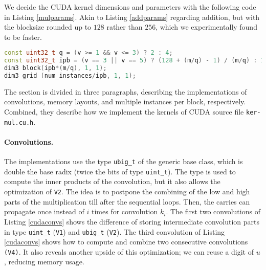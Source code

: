 We decide the CUDA kernel dimensions and parameters with the following code in
Listing \ref{mulparams}. Akin to Listing \ref{addparams} regarding addition, but
with the blocksize rounded up to $128$ rather than $256$, which we
experimentally found to be faster.

\begin{lstlisting}[language=CPP,caption={\footnotesize CUDA multiplication parameters and kernel dimensions.},label={mulparams}]
const uint32_t q = (v >= 1 && v <= 3) ? 2 : 4;
const uint32_t ipb = (v == 3 || v == 5) ? (128 + (m/q) - 1) / (m/q) : 1;
dim3 block(ipb*(m/q), 1, 1);
dim3 grid (num_instances/ipb, 1, 1);
\end{lstlisting}

The section is divided in three paragraphs, describing the implementations of
convolutions, memory layouts, and multiple instances per block,
respectively. Combined, they describe how we implement the kernels of CUDA
source file \texttt{ker-mul.cu.h}.

\paragraph{Convolutions.}
The implementations use the type \texttt{ubig\_t} of the generic base class,
which is double the base radix (twice the bits of type \texttt{uint\_t}). The
type is used to compute the inner products of the convolution, but it also
allows the optimization of \texttt{V2}. The idea is to postpone the combining of
the low and high parts of the multiplication till after the sequential
loops. Then, the carries can propagate once instead of $i$ times for convolution
$k_i$. The first two convolutions of Listing \ref{cudaconvs} shows the
difference of storing intermediate convolution parts in type \texttt{uint\_t}
(\texttt{V1}) and \texttt{ubig\_t} (\texttt{V2}). The third convolution of
Listing \ref{cudaconvs} shows how to compute and combine two consecutive
convolutions \texttt{(V4)}. It also reveals another upside of this optimization;
we can reuse a digit of $u$, reducing memory usage.


